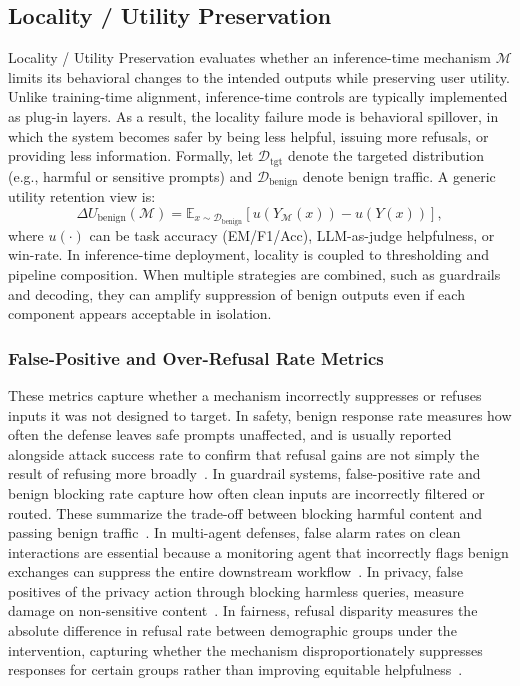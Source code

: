 \subsection{Locality / Utility Preservation}
Locality / Utility Preservation evaluates whether an inference-time mechanism $\mathcal{M}$ limits its behavioral changes to the intended outputs while preserving user utility. Unlike training-time alignment, inference-time controls are typically implemented as plug-in layers. As a result, the locality failure mode is behavioral spillover, in which the system becomes safer by being less helpful, issuing more refusals, or providing less information. Formally, let $\mathcal{D}_{\text{tgt}}$ denote the targeted distribution (e.g., harmful or sensitive prompts) and $\mathcal{D}_{\text{benign}}$ denote benign traffic. A generic utility retention view is:
\[
\Delta U_{\text{benign}}(\mathcal{M})
=
\mathbb{E}_{x\sim \mathcal{D}_{\text{benign}}}\!\left[u\!\left(Y_{\mathcal{M}}(x)\right) - u\!\left(Y(x)\right)\right],
\]
where $u(\cdot)$ can be task accuracy (EM/F1/Acc), LLM-as-judge helpfulness, or win-rate. In inference-time deployment, locality is coupled to thresholding and pipeline composition. When multiple strategies are combined, such as guardrails and decoding, they can amplify suppression of benign outputs even if each component appears acceptable in isolation.


\subsubsection{False-Positive and Over-Refusal Rate Metrics}
These metrics capture whether a mechanism incorrectly suppresses or refuses inputs it was not designed to target. In safety, benign response rate measures how often the defense leaves safe prompts unaffected, and is usually reported alongside attack success rate to confirm that refusal gains are not simply the result of refusing more broadly~\citep{kumar2024certifying, cao2024defending, ji2024defending, zhou2024defending}. In guardrail systems, false-positive rate and benign blocking rate capture how often clean inputs are incorrectly filtered or routed. These summarize the trade-off between blocking harmful content and passing benign traffic~\citep{Padhi2024GraniteG, Chi2024LlamaG3, Kumar2025PolyGuardAM, Liu2025GuardReasonerTR}. In multi-agent defenses, false alarm rates on clean interactions are essential because a monitoring agent that incorrectly flags benign exchanges can suppress the entire downstream workflow~\citep{fan2025peerguarddefendingmultiagentsystems, asad2025reddebatesaferresponsesmultiagent}. In privacy, false positives of the privacy action through blocking harmless queries, measure damage on non-sensitive content~\citep{pawelczyk2023context, Wang2025PrivacyAwareDM}. In fairness, refusal disparity measures the absolute difference in refusal rate between demographic groups under the intervention, capturing whether the mechanism disproportionately suppresses responses for certain groups rather than improving equitable helpfulness~\citep{dwivedi2023breaking, huang2024bias, kamruzzaman2024prompting}.


